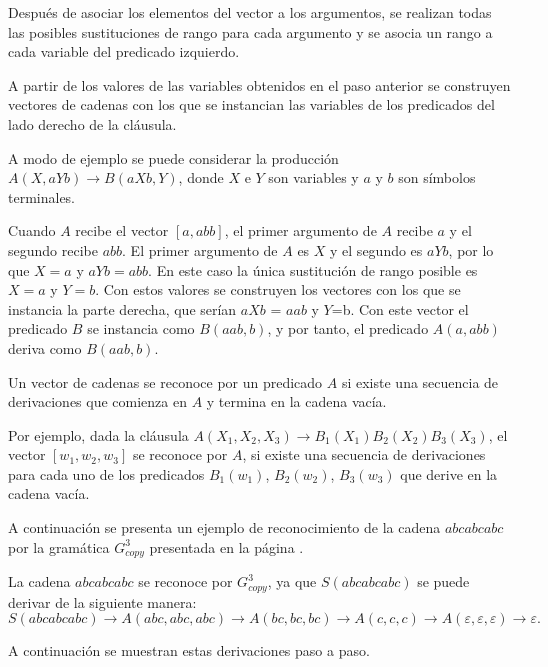 \documentclass[12pt]{article}
\begin{document}
Después de asociar los elementos del vector a los argumentos, se realizan todas las posibles sustituciones de rango para cada argumento y se asocia un rango a 
cada variable del predicado izquierdo.

A partir de los valores de las variables obtenidos en el paso anterior se construyen vectores de cadenas con los que se 
instancian las variables de los predicados del lado derecho de la cláusula.

A modo de ejemplo se puede considerar la producción $A(X,aYb)\to B(aXb,Y)$, donde $X$ e $Y$ son variables y $a$ y $b$ son símbolos terminales.

Cuando $A$ recibe el vector $[a,abb]$, el primer argumento de $A$ recibe $a$ y el segundo recibe $abb$.  El primer argumento de $A$ es $X$ y el segundo es $aYb$, por lo que $X=a$ y $aYb=abb$. En este caso la única sustitución de rango posible es $X=a$ y $Y=b$. Con estos valores se construyen los vectores con los que se instancia la parte derecha, que serían $aXb$ = $aab$ y $Y$=b. Con este vector el predicado $B$ se instancia como $B(aab,b)$, y por tanto, el predicado $A(a,abb)$ deriva como $B(aab,b)$.


Un vector de cadenas se reconoce por un predicado $A$ si existe una secuencia de derivaciones que comienza en $A$ y termina en la cadena vacía.

Por ejemplo, dada la cláusula $A(X_1,X_2,X_3)\to B_1(X_1)B_2(X_2)B_3(X_3)$, el vector $[w_1,w_2,w_3]$ se reconoce por $A$, si existe una secuencia de derivaciones para cada uno de los predicados $B_1(w_1)$, $B_2(w_2)$, $B_3(w_3)$ que derive en la cadena vacía.

A continuación se presenta un ejemplo de reconocimiento de la cadena $abcabcabc$ por la gramática $G^3_{copy}$
presentada en la página \pageref{g_3copy}.

La cadena $abcabcabc$ se reconoce por $G^3_{copy}$, ya que $S(abcabcabc)$ se puede derivar de la siguiente manera:
$$S(abcabcabc)\to A(abc,abc,abc)\to A(bc,bc,bc)\to A(c,c,c)\to A(\varepsilon,\varepsilon,\varepsilon)\to \varepsilon.$$

A continuación se muestran estas derivaciones paso a paso.
\end{document}
